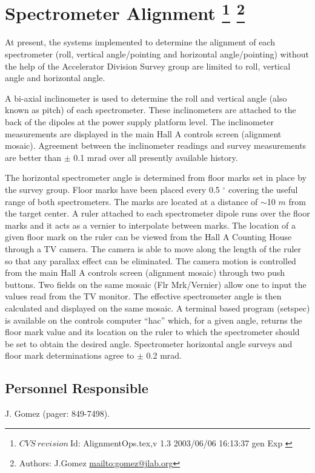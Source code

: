 \section[Spectrometer Alignment]{Spectrometer Alignment
\footnote{
  $CVS~revision~ $Id: AlignmentOps.tex,v 1.3 2003/06/06 16:13:37 gen Exp $ $ 
}
\footnote{Authors: J.Gomez \url{mailto:gomez@jlab.org}}
}

At present, the systems implemented to determine the alignment of each spectrometer
(roll, vertical angle/pointing and horizontal angle/pointing) without the help of the
Accelerator Division Survey group are limited to roll, vertical angle and horizontal angle.

A bi-axial inclinometer is used to determine the roll and vertical angle (also known as pitch)
of each spectrometer. These inclinometers are attached to the back of the dipoles at the power
supply platform level. The inclinometer measurements are displayed in the main Hall A controls
screen (alignment mosaic). Agreement between the inclinometer readings and survey measurements
are better than $\pm$ 0.1 mrad over all presently available history.

The horizontal spectrometer angle is determined from floor marks set in
place by the survey group. Floor marks have been placed every 0.5 $^\circ$ covering the useful range of
both spectrometers. The marks are located at a distance of $\sim$10 $m$ from the target center.
A ruler attached to each spectrometer dipole runs over the floor marks and it acts as a vernier to interpolate
between marks. The location of a given floor mark on the ruler can be viewed from the Hall A Counting
House through a TV camera. The camera is able to move along the length of the ruler so that any
parallax effect can be eliminated. The camera motion is controlled from the main Hall A controls screen
(alignment mosaic) through two push buttons. Two fields on the
same mosaic (Flr Mrk/Vernier) allow one to input
the values read from the TV monitor. The effective spectrometer angle is then calculated and displayed
on the same mosaic. A terminal based program (setspec) is available on the controls computer ``hac'' which, for
a given angle, returns the floor mark value and its location on the ruler to which the spectrometer should be set
to obtain the desired angle. Spectrometer horizontal angle surveys and floor mark determinations
agree to $\pm$ 0.2 mrad.

\subsection{Personnel Responsible}
J. Gomez (pager: 849-7498). 

